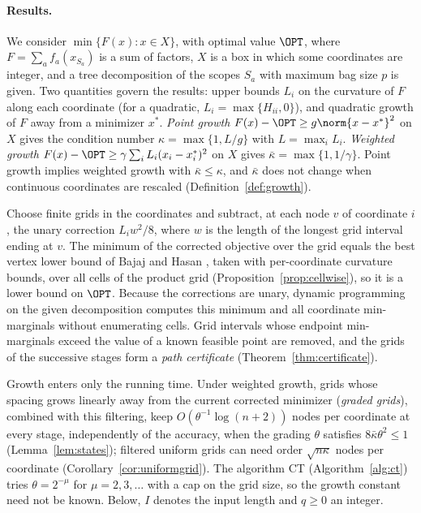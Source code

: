 \paragraph{Results.}\label{sec:intro-results}
We consider $\min\{F(x):x\in X\}$, with optimal value $\OPT$, where
$F=\sum_af_a(x_{S_a})$ is a sum of factors, $X$ is a box in which some
coordinates are integer, and a tree decomposition of the scopes $S_a$ with
maximum bag size $p$ is given. Two quantities govern the results: upper bounds
$L_i$ on the curvature of $F$ along each coordinate (for a quadratic,
$L_i=\max\{H_{ii},0\}$), and quadratic growth of $F$ away from a minimizer
$x^*$. \emph{Point growth} $F(x)-\OPT\ge g\norm{x-x^*}^2$ on $X$ gives the
condition number $\kappa=\max\{1,L/g\}$ with $L=\max_iL_i$. \emph{Weighted
growth} $F(x)-\OPT\ge\gamma\sum_iL_i(x_i-x_i^*)^2$ on $X$ gives
$\bar\kappa=\max\{1,1/\gamma\}$. Point growth implies weighted growth with
$\bar\kappa\le\kappa$, and $\bar\kappa$ does not change when continuous
coordinates are rescaled (Definition~\ref{def:growth}).

Choose finite grids in the coordinates and subtract, at each node $v$ of
coordinate $i$, the unary correction $L_iw^2/8$, where $w$ is the length of the
longest grid interval ending at $v$. The minimum of the corrected objective
over the grid equals the best vertex lower bound of Bajaj and Hasan
\cite{BajajHasan2020}, taken with per-coordinate curvature bounds, over all
cells of the product grid (Proposition~\ref{prop:cellwise}), so it is a lower
bound on $\OPT$. Because the corrections are unary, dynamic programming on
the given decomposition computes this minimum and all coordinate
min-marginals without enumerating cells. Grid intervals whose
endpoint min-marginals exceed the value of a known feasible point are
removed, and the grids of the successive stages form a \emph{path
certificate} (Theorem~\ref{thm:certificate}).

Growth enters only the running time. Under weighted growth, grids whose
spacing grows linearly away from the current corrected minimizer
(\emph{graded grids}), combined with this filtering, keep
$O(\theta^{-1}\log(n+2))$ nodes per coordinate at every stage, independently
of the accuracy, when the grading $\theta$ satisfies $8\bar\kappa\theta^2\le1$
(Lemma~\ref{lem:states}); filtered uniform grids can need order
$\sqrt{n\kappa}$ nodes per coordinate (Corollary~\ref{cor:uniformgrid}).
The algorithm CT (Algorithm~\ref{alg:ct}) tries
$\theta=2^{-\mu}$ for $\mu=2,3,\dots$ with a cap on the grid size, so the
growth constant need not be known. Below, $I$ denotes the input length and
$q\ge0$ an integer.

